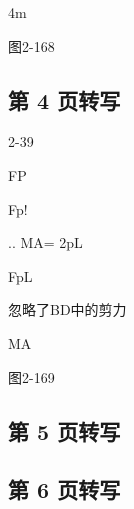 4m

图2-168

\subsection*{第 4 页转写}
2-39

FP

Fp!

.. MA= 2pL

FpL

忽略了BD中的剪力

MA

图2-169

\subsection*{第 5 页转写}
\emph{}

\subsection*{第 6 页转写}
\emph{}

